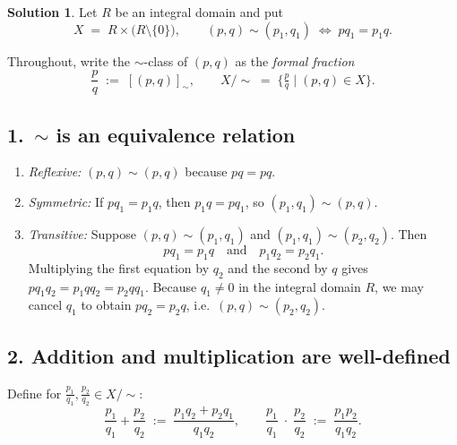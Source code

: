 \documentclass[12pt]{article}
\theoremstyle{definition} %
\newtheorem{solution}{Solution}
\theoremstyle{plain} %
\begin{document}
  \begin{solution}
    Let $R$ be an integral domain and put
    \[
      X \;=\; R \times \bigl(R\setminus\{0\}\bigr), 
      \qquad
      (p,q)\sim(p_1,q_1) \;\Longleftrightarrow\; pq_1=p_1q.
    \]
    
    Throughout, write the $\sim$-class of $(p,q)$ as the \emph{formal fraction}
    \[
      \frac{p}{q}\;:=\;[(p,q)]_{\sim},
      \qquad
      X/\!\sim \;=\;\bigl\{\tfrac{p}{q}\mid(p,q)\in X\bigr\}.
    \]
    
    \subsection*{1.  \,$\sim$ is an equivalence relation}
    \begin{enumerate}[label=\textbf{(\alph*)}]
      \item \emph{Reflexive:} $(p,q)\sim(p,q)$ because $pq=pq$.
      \item \emph{Symmetric:} If $pq_{1}=p_{1}q$, then $p_{1}q=pq_{1}$, so
            $(p_{1},q_{1})\sim(p,q)$.
      \item \emph{Transitive:}  Suppose $(p,q)\sim(p_{1},q_{1})$ and
            $(p_{1},q_{1})\sim(p_{2},q_{2})$.  Then
            \[
              pq_{1}=p_{1}q
              \quad\text{and}\quad
              p_{1}q_{2}=p_{2}q_{1}.
            \]
            Multiplying the first equation by $q_{2}$ and the second by $q$
            gives $pq_{1}q_{2}=p_{1}qq_{2}=p_{2}qq_{1}$.
            Because $q_{1}\neq0$ in the integral domain $R$, we may cancel
            $q_{1}$ to obtain $pq_{2}=p_{2}q$, i.e.\ $(p,q)\sim(p_{2},q_{2})$.
    \end{enumerate}
    
    \subsection*{2.  Addition and multiplication are well-defined}
    
    Define for $\tfrac{p_{1}}{q_{1}},\tfrac{p_{2}}{q_{2}}\in X/\!\sim$:
    \[
      \frac{p_{1}}{q_{1}}+\frac{p_{2}}{q_{2}}
      \;:=\;\frac{p_{1}q_{2}+p_{2}q_{1}}{q_{1}q_{2}},
      \qquad
      \frac{p_{1}}{q_{1}}\;\cdot\;\frac{p_{2}}{q_{2}}
      \;:=\;\frac{p_{1}p_{2}}{q_{1}q_{2}}.
    \]
    

\end{solution}
\end{document}
